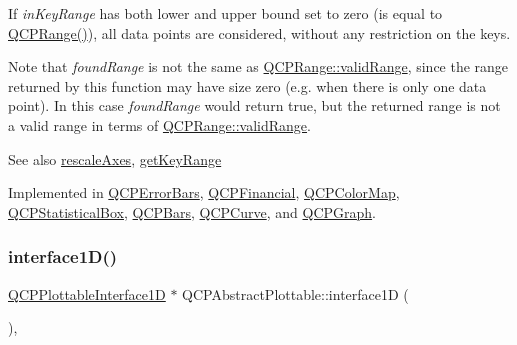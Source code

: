 If {\itshape in\+Key\+Range} has both lower and upper bound set to zero (is equal to {\ttfamily \hyperlink{class_q_c_p_range}{Q\+C\+P\+Range()}}), all data points are considered, without any restriction on the keys.

Note that {\itshape found\+Range} is not the same as \hyperlink{class_q_c_p_range_ab38bd4841c77c7bb86c9eea0f142dcc0}{Q\+C\+P\+Range\+::valid\+Range}, since the range returned by this function may have size zero (e.\+g. when there is only one data point). In this case {\itshape found\+Range} would return true, but the returned range is not a valid range in terms of \hyperlink{class_q_c_p_range_ab38bd4841c77c7bb86c9eea0f142dcc0}{Q\+C\+P\+Range\+::valid\+Range}.

\begin{DoxySeeAlso}{See also}
\hyperlink{class_q_c_p_abstract_plottable_a1491c4a606bccd2d09e65e11b79eb882}{rescale\+Axes}, \hyperlink{class_q_c_p_abstract_plottable_a4da16d3cd4b509e1104a9b0275623c96}{get\+Key\+Range} 
\end{DoxySeeAlso}


Implemented in \hyperlink{class_q_c_p_error_bars_ab76215a186ae4862235821e028685f26}{Q\+C\+P\+Error\+Bars}, \hyperlink{class_q_c_p_financial_a82d862aa134d78853f98f8c57a03415b}{Q\+C\+P\+Financial}, \hyperlink{class_q_c_p_color_map_a88134493aaf6b297af34eaab65264fff}{Q\+C\+P\+Color\+Map}, \hyperlink{class_q_c_p_statistical_box_ab3388a21d0c2e86fbc0cba9c06ceb49b}{Q\+C\+P\+Statistical\+Box}, \hyperlink{class_q_c_p_bars_a02cee4bf94d48a1e5f6fc185d9a10477}{Q\+C\+P\+Bars}, \hyperlink{class_q_c_p_curve_a8bb8e3b9085f15921dc40483fb025ab2}{Q\+C\+P\+Curve}, and \hyperlink{class_q_c_p_graph_a8f773e56f191a61c06e129e90a604d77}{Q\+C\+P\+Graph}.

\mbox{\label{class_q_c_p_abstract_plottable_a81fd9fd5c4f429c074785e2eb238a8e7}} 
\subsubsection{\texorpdfstring{interface1\+D()}{interface1D()}}
{\footnotesize\ttfamily \hyperlink{class_q_c_p_plottable_interface1_d}{Q\+C\+P\+Plottable\+Interface1D} $\ast$ Q\+C\+P\+Abstract\+Plottable\+::interface1D (\begin{DoxyParamCaption}{ }\end{DoxyParamCaption})\hspace{0.3cm}{\ttfamily [inline]}, {\ttfamily [virtual]}}

